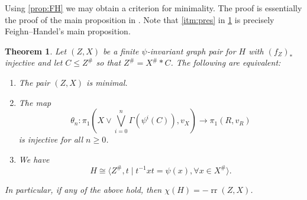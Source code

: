 \documentclass[11pt, a4paper]{amsart}
\newtheorem{theorem}{Theorem}[section]
\theoremstyle{definition}
\newcommand{\isom}{\cong}
\DeclareMathOperator{\rr}{rr}
\begin{document}
Using \cref{prop:FH} we may obtain a criterion for minimality. The proof is essentially the proof of the main proposition in \cite{FH99}. Note that \cref{itm:pres} in \cref{FHmain} is precisely Feighn--Handel's main proposition.

\begin{theorem}
\label{FHmain}
Let $(Z, X)$ be a finite $\psi$-invariant graph pair for $H$ with $(f_Z)_*$ injective and let $C\leqslant Z^{\#}$ so that $Z^{\#} = X^{\#}*C$. The following are equivalent:
\begin{enumerate}
\item\label{itm:min} The pair $(Z, X)$ is minimal.
\item\label{itm:inj} The map
\[
\theta_n\colon\pi_1\left(X\vee \bigvee_{i=0}^n\Gamma(\psi^i(C)), v_X\right) \to \pi_1(R, v_R)
\]
is injective for all $n\geqslant 0$.
\item\label{itm:pres} We have
\[
H\isom \langle Z^{\#}, t \mid t^{-1}xt = \psi(x), \forall x\in X^{\#}\rangle.
\]
\end{enumerate}
In particular, if any of the above hold, then $\chi(H) = -\rr(Z, X)$.
\end{theorem}
\end{document}
